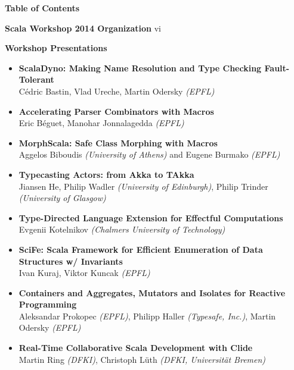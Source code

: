 \documentclass[10pt]{book}
\title{}
\date{}
\begin{document}
\thispagestyle{empty}


{\centering \LARGE \bf Table of Contents\par}

\vspace{0.5cm}
\large \textbf{Scala Workshop 2014 Organization}  vi
\normalsize

\vspace{0.5cm}
\large \textbf{Workshop Presentations}
\normalsize
\begin{itemize}
\item {\bf ScalaDyno: Making Name Resolution and Type Checking Fault-Tolerant} \\
C\'{e}dric Bastin, Vlad Ureche, Martin Odersky {\em (EPFL)}
\item {\bf Accelerating Parser Combinators with Macros} \\
Eric B\'{e}guet, Manohar Jonnalagedda {\em (EPFL)}
\item {\bf MorphScala: Safe Class Morphing with Macros} \\
Aggelos Biboudis {\em (University of Athens)} and Eugene Burmako {\em (EPFL)}
\item {\bf Typecasting Actors: from Akka to TAkka} \\
Jiansen He, Philip Wadler {\em (University of Edinburgh)}, Philip Trinder {\em (University of Glasgow)}
\item {\bf Type-Directed Language Extension for Effectful Computations} \\
Evgenii Kotelnikov {\em (Chalmers University of Technology)}
\item {\bf SciFe: Scala Framework for Efficient Enumeration of Data Structures w/ Invariants} \\
Ivan Kuraj, Viktor Kuncak {\em (EPFL)}
\item {\bf Containers and Aggregates, Mutators and Isolates for Reactive Programming} \\
Aleksandar Prokopec {\em(EPFL)}, Philipp Haller {\em(Typesafe, Inc.)}, Martin Odersky {\em(EPFL)}
\item {\bf Real-Time Collaborative Scala Development with Clide} \\
Martin Ring {\em(DFKI)}, Christoph L\"{u}th {\em(DFKI, Universit\"{a}t Bremen)}
\end{itemize}
\end{document}
